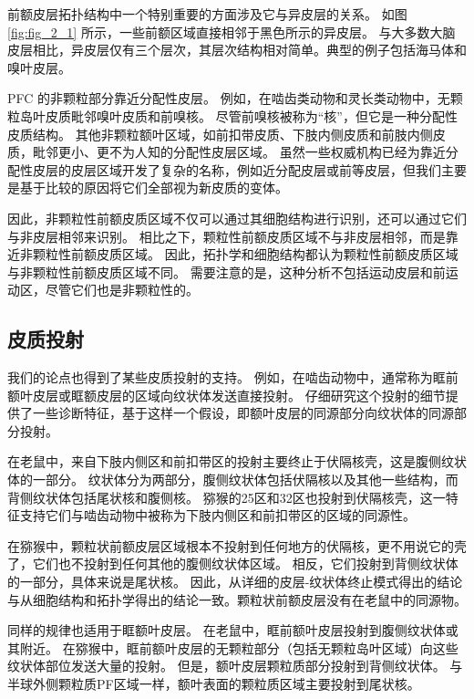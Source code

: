 前额皮层拓扑结构中一个特别重要的方面涉及它与异皮层的关系。
如图 \ref{fig:fig_2_1} 所示，一些前额区域直接相邻于黑色所示的异皮层。
与大多数大脑皮层相比，异皮层仅有三个层次，其层次结构相对简单。典型的例子包括海马体和嗅叶皮层。


PFC 的非颗粒部分靠近分配性皮层。
例如，在啮齿类动物和灵长类动物中，无颗粒岛叶皮质毗邻嗅叶皮质和前嗅核。
尽管前嗅核被称为“核”，但它是一种分配性皮质结构。
其他非颗粒额叶区域，如前扣带皮质、下肢内侧皮质和前肢内侧皮质，毗邻更小、更不为人知的分配性皮层区域。
虽然一些权威机构已经为靠近分配性皮层的皮层区域开发了复杂的名称，例如近分配皮层或前等皮层，但我们主要是基于比较的原因将它们全部视为新皮质的变体。


因此，非颗粒性前额皮质区域不仅可以通过其细胞结构进行识别，还可以通过它们与非皮层相邻来识别。
相比之下，颗粒性前额皮质区域不与非皮层相邻，而是靠近非颗粒性前额皮质区域。
因此，拓扑学和细胞结构都认为颗粒性前额皮质区域与非颗粒性前额皮质区域不同。
需要注意的是，这种分析不包括运动皮层和前运动区，尽管它们也是非颗粒性的。


\subsection{皮质投射}
我们的论点也得到了某些皮质投射的支持。
例如，在啮齿动物中，通常称为眶前额叶皮层或眶额皮层的区域向纹状体发送直接投射。
仔细研究这个投射的细节提供了一些诊断特征，基于这样一个假设，即额叶皮层的同源部分向纹状体的同源部分投射。


在老鼠中，来自下肢内侧区和前扣带区的投射主要终止于伏隔核壳，这是腹侧纹状体的一部分\cite{brog1993patterns,reynolds2005specificity}。
纹状体分为两部分，腹侧纹状体包括伏隔核以及其他一些结构，而背侧纹状体包括尾状核和腹侧核。
猕猴的25区和32区也投射到伏隔核壳\cite{haber1995orbital,haber2006reward}，这一特征支持它们与啮齿动物中被称为下肢内侧区和前扣带区的区域的同源性。


在猕猴中，颗粒状前额皮层区域根本不投射到任何地方的伏隔核，更不用说它的壳了，它们也不投射到任何其他的腹侧纹状体区域。
相反，它们投射到背侧纹状体的一部分，具体来说是尾状核\cite{selemon1985longitudinal}。
因此，从详细的皮层-纹状体终止模式得出的结论与从细胞结构和拓扑学得出的结论一致。颗粒状前额皮层没有在老鼠中的同源物。


同样的规律也适用于眶额叶皮层。
在老鼠中，眶前额叶皮层投射到腹侧纹状体或其附近\cite{berendse1992topographical}。
在猕猴中，眶前额叶皮层的无颗粒部分（包括无颗粒岛叶区域）向这些纹状体部位发送大量的投射。
但是，额叶皮层颗粒质部分投射到背侧纹状体。
与半球外侧颗粒质PF区域一样，额叶表面的颗粒质区域主要投射到尾状核\cite{haber1995orbital,haber2006reward,ferry2000prefrontal,ongur2000organization}。


